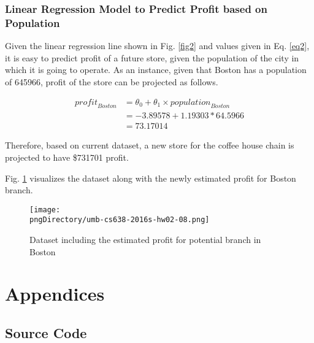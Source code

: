\documentclass[12pt,letterpaper,twoside]{article}
\begin{document}
\subsubsection*{Linear Regression Model to Predict Profit based on Population}

Given the linear regression line shown in Fig. \ref{fig2} and values given in Eq. \ref{eq2}, it is easy to predict profit of a future store, given the population of the city in which it is going to operate.
As an instance, given that Boston has a population of 645966, profit of the store can be projected as follows.

\begin{equation}\label{eq5}
\begin{split}
\mathit{profit}_\mathit{Boston} & = \theta_0 + \theta_1 \times \mathit{population}_\mathit{Boston} \\
 & = -3.89578 + 1.19303 * 64.5966 \\
 & = 73.17014
\end{split}
\end{equation}

Therefore, based on current dataset, a new store for the coffee house chain is projected to have \$731701 profit.

Fig. \ref{fig6} visualizes the dataset along with the newly estimated profit for Boston branch.

\begin{figure}[H]\centering
\texttt{[image: \\pngDirectory/umb-cs638-2016s-hw02-08.png]}
\caption{Dataset including the estimated profit for potential branch in Boston}\label{fig6}
\end{figure}

\cleardoublepage

\section*{Appendices}

\subsection*{Source Code}

\lstset{language=r,tabsize=4}

\end{document}
